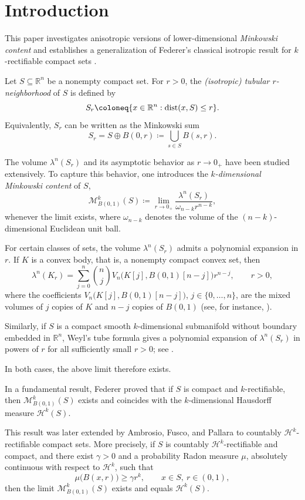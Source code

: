 \documentclass[pdflatex,sn-mathphys-num]{sn-jnl}
\theoremstyle{plain}
\theoremstyle{definition}
\DeclareMathOperator{\dist}{\textup{dist}}
\begin{document}
\section*{Introduction}\label{secIntro}

This paper investigates anisotropic versions of lower-dimensional \emph{Minkowski content} and establishes a generalization of Federer's classical isotropic result for $k$-rectifiable compact sets \cite[Theorem~3.2.39]{federer}.

Let $S\subseteq\mathbb{R}^n$ be a nonempty compact set. For $r>0$, the \emph{(isotropic) tubular $r$-neighborhood} of $S$ is defined by
\[
S_r \coloneq \{x\in\mathbb{R}^n : \dist(x,S)\le r\}.
\]
Equivalently, $S_r$ can be written as the Minkowski sum
\[
S_r = S \oplus B(0,r) \coloneq \bigcup_{s\in S} B(s,r).
\]

The volume $\lambda^n(S_r)$ and its asymptotic behavior as $r\to0_+$ have been studied extensively. To capture this behavior, one introduces the \emph{$k$-dimensional Minkowski content} of $S$,
\[
\mathcal{M}^k_{B(0,1)}(S) \coloneq 
\lim_{r\to0_+}\frac{\lambda^n(S_r)}{\omega_{n-k} r^{n-k}},
\]
whenever the limit exists, where $\omega_{n-k}$ denotes the volume of the $(n-k)$-dimensional Euclidean unit ball.

For certain classes of sets, the volume $\lambda^n(S_r)$ admits a polynomial expansion in $r$. If $K$ is a convex body, that is, a nonempty compact convex set, then $$\lambda^n(K_r)=\sum_{j=0}^n{n \choose j} V_n\big(K[j], B(0, 1)[n-j]\big)r^{n-j}, \qquad r>0,$$ where the coefficients $V_n\big(K[j], B(0, 1)[n-j]\big)$, $j\in \{0, \dots, n\}$, are the mixed volumes of $j$ copies of $K$ and $n-j$ copies of $B(0, 1)$ (see, for instance, \cite[Chapter~5]{rolf}). 

Similarly, if $S$ is a compact smooth $k$-dimensional submanifold without
boundary embedded in $\mathbb{R}^n$, Weyl's tube formula gives a polynomial
expansion of $\lambda^n(S_r)$ in powers of $r$ for all sufficiently small
$r>0$; see \cite{We}. 

In both cases, the above limit therefore exists.

\medskip

In a fundamental result, Federer \cite[Theorem~3.2.39]{federer} proved that if $S$ is compact and $k$-rectifiable, then $\mathcal{M}^k_{B(0,1)}(S)$ exists and coincides with the $k$-dimensional Hausdorff measure $\mathcal{H}^k(S)$.

This result was later extended by Ambrosio, Fusco, and Pallara \cite[Theorem~2.104]{ambrosio} to countably $\mathcal{H}^k$-rectifiable compact sets. More precisely, if $S$ is countably $\mathcal{H}^k$-rectifiable and compact, and there exist $\gamma>0$ and a probability Radon measure $\mu$, absolutely continuous with respect to $\mathcal{H}^k$, such that
\begin{equation}\label{Eq30}
\mu\big(B(x,r)\big) \geq \gamma r^k, \qquad x\in S,\ r\in(0,1),
\end{equation}
then the limit $\mathcal{M}^k_{B(0,1)}(S)$ exists and equals $\mathcal{H}^k(S)$.
\end{document}
